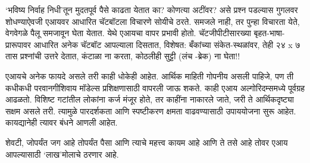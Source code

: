 `भविष्य निर्वाह निधी'तून मुदतपूर्व पैसे काढता येतात का? कोणत्या अटींवर? असे प्रश्न पडल्यास गुगलवर शोधण्याऐवजी एआयवर आधारित चॅटबॉटला विचारणे सोयीचे ठरते. समजले नाही, तर पुन्हा विचारता येते, वेगवेगळे पैलू समजावून घेता येतात. येथे एआयचा वापर प्रभावी होतो. चॅटजीपीटीसारख्या बृहत-भाषा-प्रारूपावर आधारित अनेक चॅटबॉट आपल्याला दिसतात, विशेषत: बँकांच्या संकेत-स्थळांवर, तेही २४ x ७ तास प्रश्नांची उत्तरे देतात, कंटाळा ना करता, कोठलीही सुट्टी (लंच -ब्रेक) ना घेता!!

एआयचे अनेक फायदे असले तरी काही धोकेही आहेत. आर्थिक माहिती गोपनीय असली पाहिजे, पण ती कधीकधी परवानगीशिवाय मॉडेल्स प्रशिक्षणासाठी वापरली जाऊ शकते. काही एआय अल्गोरिदम्समध्ये पूर्वग्रह आढळतो. विशिष्ट गटांतील लोकांना कर्ज मंजूर होते, तर काहींना नाकारले जाते, जरी ते आर्थिकदृष्ट्या सक्षम असले तरी. त्यामुळे पारदर्शकता आणि स्पष्टीकरण क्षमता वाढवण्यासाठी उपाययोजना सुरू आहेत. कायद्यानेही त्यावर बंधने आणली आहेत.

शेवटी, जोपर्यंत जग आहे तोपर्यंत पैसा आणि त्याचे महत्त्व  कायम आहे आणि ते तसे आहे तोवर एआय आपल्यासाठी `लाख'मोलाचे ठरणार आहे.